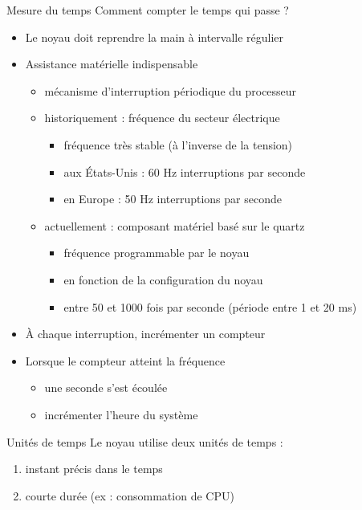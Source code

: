 \begin {frame} {Mesure du temps}
    Comment compter le temps qui passe ?

    \begin {itemize}
	\item Le noyau doit reprendre la main à intervalle régulier
	\item Assistance matérielle indispensable
	    \begin {itemize}
		\item mécanisme d'interruption périodique du processeur
		\item historiquement : fréquence du secteur électrique
		    \begin {itemize}
			\item fréquence très stable (à l'inverse de la tension)
			\item aux États-Unis : 60 Hz  interruptions
			    par seconde
			\item en Europe : 50 Hz  interruptions
			    par seconde
		    \end {itemize}

		\item actuellement : composant matériel basé sur le quartz
		    \begin {itemize}
			\item fréquence programmable par le noyau
			\item en fonction de la configuration du noyau
			\item entre 50 et 1000 fois par seconde
			    (période entre 1 et 20 ms)
		    \end {itemize}
	    \end {itemize}
	\item À chaque interruption, incrémenter un compteur
	\item Lorsque le compteur atteint la fréquence
	    \begin {itemize}
		\item une seconde s'est écoulée
		\item incrémenter l'heure du système
	    \end {itemize}
    \end {itemize}
\end {frame}

\begin {frame} {Unités de temps}
    Le noyau utilise deux unités de temps :

    \begin {enumerate}
	\item instant précis dans le temps
	\item courte durée (ex : consommation de CPU)
    \end {enumerate}
\end {frame}

